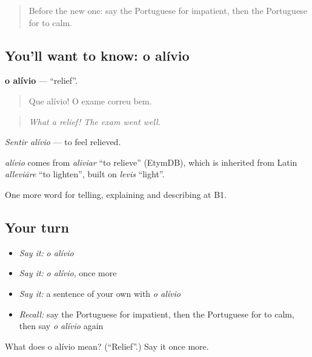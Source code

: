 \label{lesson:PT-C475-alivio}



\begin{quote}
Before the new one: say the Portuguese for impatient, then the Portuguese for to calm.
\end{quote}

\subsection*{You'll want to know: o alívio}
\textbf{o alívio} — \textquotedblleft{}relief\textquotedblright{}.

\begin{quote}
Que alívio! O exame correu bem.
\end{quote}

\begin{quote}
\emph{What a relief! The exam went well.}
\end{quote}

\emph{Sentir alívio} — to feel relieved.

\begin{cousinweb}
\emph{alívio} comes from \emph{aliviar} \textquotedblleft{}to relieve\textquotedblright{} (EtymDB), which is inherited from Latin \emph{alleviāre} \textquotedblleft{}to lighten\textquotedblright{}, built on \emph{levis} \textquotedblleft{}light\textquotedblright{}.
\end{cousinweb}

\begin{grammarlens}[title={What you've built}]
One more word for telling, explaining and describing at B1.
\end{grammarlens}

\subsection*{Your turn}
\begin{itemize}
\raggedright
  \item \emph{Say it:} \emph{o alívio}
  \item \emph{Say it:} \emph{o alívio}, once more
  \item \emph{Say it:} a sentence of your own with \emph{o alívio}
  \item \emph{Recall:} say the Portuguese for impatient, then the Portuguese for to calm, then say \emph{o alívio} again
\end{itemize}

\begin{tcolorbox}[breakable,colback=teal!4,colframe=teal!35!black,title={Before you move on}]
What does o alívio mean? (\textquotedblleft{}Relief\textquotedblright{}.) Say it once more.
\end{tcolorbox}
